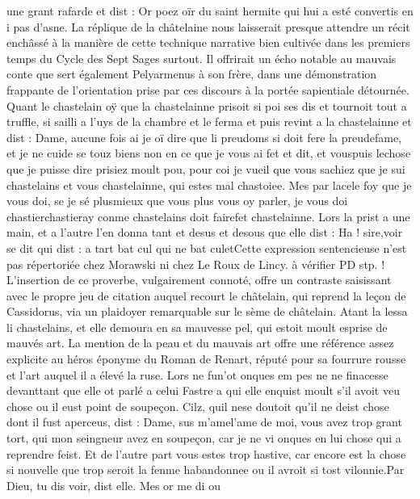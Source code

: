 \documentclass{article}
\begin{document}
\begin{pages}
   une grant rafarde et dist :
   Or poez oïr du saint hermite qui hui a esté convertis en i pas d’asne.
   La réplique de la châtelaine nous laisserait presque attendre un récit enchâssé à la manière de cette 
   technique narrative bien cultivée dans les premiers temps du Cycle des Sept Sages surtout. Il offrirait un écho notable 
   au mauvais conte que sert également Pelyarmenus à son frère, dans une démonstration frappante de l'orientation prise par ces 
   discours à la portée sapientiale détournée. \pend
\pstart Quant le chastelain oÿ que 
   la chastelainne prisoit si poi ses dis et tournoit tout a truffle, 
   si sailli a l’uys de la chambre et le ferma et puis revint a la chastelainne et dist :
   Dame, aucune fois ai je oï dire que li preudoms si doit fere la preudefame, 
      et je ne cuide se touz biens non en ce que je vous ai fet et dit, et vouspuis 
      lechose que je puisse dire prisiez moult pou, 
   pour coi je vueil que vous sachiez que je sui chastelains et vous chastelainne, qui estes mal chastoiee. 
   Mes par lacele foy que je vous doi, se je 
      sé plusmieux que vous
       plus vous oy parler, je vous doi chastierchastieray 
      conme chastelains doit fairefet chastelainne.
   Lors la prist a une main, et a l’autre l’en donna tant et desus et desous que elle dist :
   Ha ! sire,voir se dit qui dist : 
      a tart bat cul qui ne bat culetCette 
         expression sentencieuse n'est pas répertoriée chez Morawski ni chez Le Roux de Lincy. à vérifier PD stp. !
   L'insertion de ce proverbe, vulgairement connoté, offre un contraste saisissant avec le propre jeu 
   de citation auquel recourt le châtelain, qui reprend la leçon de Cassidorus, via un plaidoyer remarquable sur le sème de châtelain.
   Atant la lessa li chastelains, et elle demoura en sa mauvesse pel, qui estoit moult esprise de mauvés 
   art. La mention de la peau et du mauvais art offre une référence assez explicite au héros éponyme 
   du Roman de Renart, réputé pour sa fourrure rousse et l'art auquel il a élevé la ruse. 
   Lors ne fun'ot onques em 
   pes ne ne finacesse 
   devanttant que elle ot parlé a celui 
   Fastre a qui elle enquist moult s’il avoit veu chose ou 
      il eust point de soupeçon. 
   Cilz, quil nese doutoit qu’il ne deist chose 
   dont il fust aperceus, dist :
   Dame, sus m’amel'ame de moi, 
      vous avez trop grant tort, qui mon seingneur avez en soupeçon, 
   car je ne vi onques en lui chose qui a reprendre feist. Et de l’autre part vous estes trop hastive, 
   car encore est la chose si nouvelle que trop seroit la fenme habandonnee ou il avroit si tost vilonnie.Par Dieu, tu dis voir, dist elle. Mes or me di ou 

\end{pages}
\end{document}
